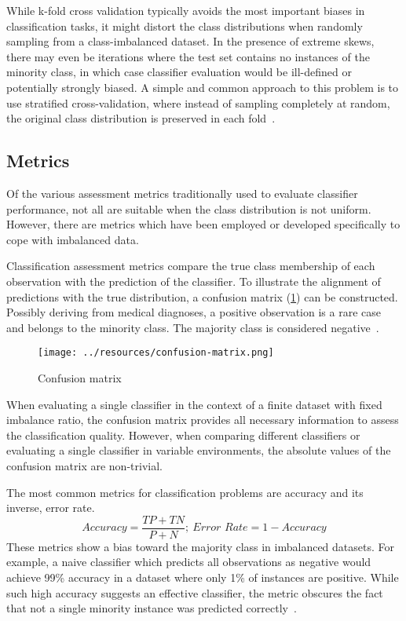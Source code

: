 \documentclass[sort&compress]{elsarticle}
\begin{document}
While k-fold cross validation typically avoids the most important biases in classification tasks, it might distort the class distributions when randomly sampling from a class-imbalanced dataset. In the presence of extreme skews, there may even be iterations where the test set contains no instances of the minority class, in which case classifier evaluation would be ill-defined or potentially strongly biased. A simple and common approach to this problem is to use stratified cross-validation, where instead of sampling completely at random, the original class distribution is preserved in each fold~\citep{Japkowicz.2013}.

	\subsection{Metrics}
	Of the various assessment metrics traditionally used to evaluate classifier performance, not all are suitable when the class distribution is not uniform. However, there are metrics which have been employed or developed specifically to cope with imbalanced data.

	Classification assessment metrics compare the true class membership of each observation with the prediction of the classifier. To illustrate the alignment of predictions with the true distribution, a confusion matrix (\cref{fig:confusion-matrix}) can be constructed.	Possibly deriving from medical diagnoses, a positive observation is a rare case and belongs to the minority class. The majority class is considered negative~\citep{Japkowicz.2013}.

	\begin{figure}[ht]
	\centering
	\texttt{[image: ../resources/confusion-matrix.png]}
	\caption{Confusion matrix}
    \label{fig:confusion-matrix}
	\end{figure}
	
	When evaluating a single classifier in the context of a finite dataset with fixed imbalance ratio, the confusion matrix provides all necessary information to assess the classification quality. However, when comparing different classifiers or evaluating a single classifier in variable environments, the absolute values of the confusion matrix are non-trivial.

	The most common metrics for classification problems are accuracy and its inverse, error rate.
	\begin{equation}
	Accuracy = \frac{TP + TN}{P + N};\ \textit{Error Rate} = 1 - Accuracy
	\end{equation}
	These metrics show a bias toward the majority class in imbalanced datasets. For example, a naive classifier which predicts all observations as negative would achieve 99\% accuracy in a dataset where only 1\% of instances are positive. While such high accuracy suggests an effective classifier, the metric obscures the fact that not a single minority instance was predicted correctly~\citep{He.2009}.
\end{document}
